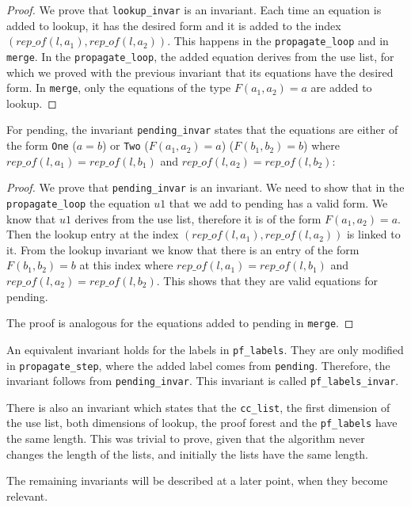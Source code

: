\begin{proof}
We prove that \lstinline|lookup_invar| is an invariant.
Each time an equation is added to lookup, it has the desired form and it is added to the index $(rep\_of(l, a_1), rep\_of(l, a_2))$. This happens in the \lstinline{propagate_loop} and in \lstinline{merge}. In the \lstinline{propagate_loop}, the added equation derives from the use list, for which we proved with the previous invariant that its equations have the desired form. In \lstinline|merge|, only the equations of the type $F(a_1, a_2) = a$ are added to lookup.
\end{proof}

For pending, the invariant \lstinline|pending_invar| states that the equations are either of the form \lstinline{One} ($a = b$) or \lstinline{Two} ($F(a_1, a_2) = a$) ($F(b_1, b_2) = b$) where $rep\_of(l, a_1) = rep\_of(l, b_1)$ and $rep\_of(l, a_2) = rep\_of(l, b_2)$:

\begin{proof}
We prove that \lstinline|pending_invar| is an invariant.
We need to show that in the \lstinline{propagate_loop} the equation $u1$ that we add to pending has a valid form. We know that $u1$ derives from the use list, therefore it is of the form $F(a_1, a_2) = a$. Then the lookup entry at the index $(rep\_of(l, a_1), rep\_of(l, a_2))$ is linked to it. From the lookup invariant we know that there is an entry of the form $F(b_1, b_2) = b$ at this index where $rep\_of(l, a_1) = rep\_of(l, b_1)$ and $rep\_of(l, a_2) = rep\_of(l, b_2)$. This shows that they are valid equations for pending.

The proof is analogous for the equations added to pending in \lstinline{merge}.
\end{proof}

An equivalent invariant holds for the labels in \lstinline|pf_labels|. They are only modified in \lstinline|propagate_step|, where the added label comes from \lstinline|pending|.
Therefore, the invariant follows from \lstinline|pending_invar|. This invariant is called \lstinline|pf_labels_invar|.

There is also an invariant which states that the \lstinline{cc_list}, the first dimension of the use list, both dimensions of lookup, the proof forest and the \lstinline{pf_labels} have the same length. This was trivial to prove, given that the algorithm never changes the length of the lists, and initially the lists have the same length.

The remaining invariants will be described at a later point, when they become relevant.

